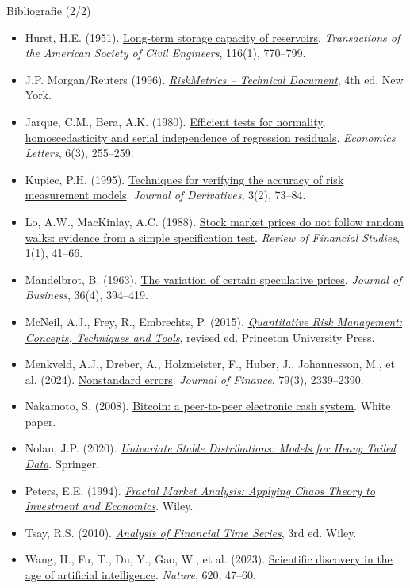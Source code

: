 \begin{frame}{Bibliografie (2/2)}
\itemsize{\tiny}
\begin{itemize}
    \item Hurst, H.E. (1951). \href{https://doi.org/10.1061/TACEAT.0006518}{Long-term storage capacity of reservoirs}. \textit{Transactions of the American Society of Civil Engineers}, 116(1), 770--799.
    \item J.P. Morgan/Reuters (1996). \href{https://www.msci.com/documents/10199/5915b101-4206-4ba0-aee2-3449d5c7e95a}{\textit{RiskMetrics -- Technical Document}}, 4th ed. New York.
    \item Jarque, C.M., Bera, A.K. (1980). \href{https://doi.org/10.1016/0165-1765(80)90024-5}{Efficient tests for normality, homoscedasticity and serial independence of regression residuals}. \textit{Economics Letters}, 6(3), 255--259.
    \item Kupiec, P.H. (1995). \href{https://doi.org/10.3905/jod.1995.407942}{Techniques for verifying the accuracy of risk measurement models}. \textit{Journal of Derivatives}, 3(2), 73--84.
    \item Lo, A.W., MacKinlay, A.C. (1988). \href{https://doi.org/10.1093/rfs/1.1.41}{Stock market prices do not follow random walks: evidence from a simple specification test}. \textit{Review of Financial Studies}, 1(1), 41--66.
    \item Mandelbrot, B. (1963). \href{https://doi.org/10.1086/294632}{The variation of certain speculative prices}. \textit{Journal of Business}, 36(4), 394--419.
    \item McNeil, A.J., Frey, R., Embrechts, P. (2015). \href{https://press.princeton.edu/books/hardcover/9780691166278/quantitative-risk-management}{\textit{Quantitative Risk Management: Concepts, Techniques and Tools}}, revised ed. Princeton University Press.
    \item Menkveld, A.J., Dreber, A., Holzmeister, F., Huber, J., Johannesson, M., et al. (2024). \href{https://doi.org/10.1111/jofi.13337}{Nonstandard errors}. \textit{Journal of Finance}, 79(3), 2339--2390.
    \item Nakamoto, S. (2008). \href{https://bitcoin.org/bitcoin.pdf}{Bitcoin: a peer-to-peer electronic cash system}. White paper.
    \item Nolan, J.P. (2020). \href{https://doi.org/10.1007/978-3-030-52915-4}{\textit{Univariate Stable Distributions: Models for Heavy Tailed Data}}. Springer.
    \item Peters, E.E. (1994). \href{https://www.wiley.com/en-us/Fractal+Market+Analysis\%3A+Applying+Chaos+Theory+to+Investment+and+Economics-p-9780471585244}{\textit{Fractal Market Analysis: Applying Chaos Theory to Investment and Economics}}. Wiley.
    \item Tsay, R.S. (2010). \href{https://doi.org/10.1002/9780470644560}{\textit{Analysis of Financial Time Series}}, 3rd ed. Wiley.
    \item Wang, H., Fu, T., Du, Y., Gao, W., et al. (2023). \href{https://doi.org/10.1038/s41586-023-06221-2}{Scientific discovery in the age of artificial intelligence}. \textit{Nature}, 620, 47--60.
\end{itemize}
\end{frame}


